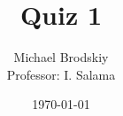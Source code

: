 


\title{Quiz 1}
\date{\today}
\author{Michael Brodskiy\\ \small Professor: I. Salama}



\maketitle


